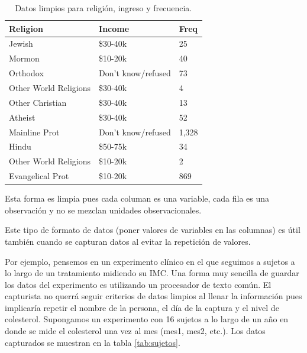 \documentclass[]{article}
\begin{document}
\begin{table}[ht]
\centering
\begin{tabular}{lll}
  \hline
Religion & Income & Freq \\ 
  \hline
Jewish & \$30-40k & 25 \\ 
  Mormon & \$10-20k & 40 \\ 
  Orthodox & Don't know/refused & 73 \\ 
  Other World Religions & \$30-40k & 4 \\ 
  Other Christian & \$30-40k & 13 \\ 
  Atheist & \$30-40k & 52 \\ 
  Mainline Prot & Don't know/refused & 1,328 \\ 
  Hindu & \$50-75k & 34 \\ 
  Other World Religions & \$10-20k & 2 \\ 
  Evangelical Prot & \$10-20k & 869 \\ 
   \hline
\end{tabular}
\caption{Datos limpios para religión, ingreso y frecuencia.} 
\label{tab:ej1limpio}
\end{table}

\begin{nota}[Nota] 
Esta forma es limpia pues cada columan es una variable, cada fila es una observación
y no se mezclan unidades observacionales.
\end{nota}

Este tipo de formato de datos (poner valores de variables en las
columnas) es útil también cuando se capturan datos al evitar la
repetición de valores.

Por ejemplo, pensemos en un experimento clínico en el que seguimos a
sujetos a lo largo de un tratamiento midiendo su IMC. Una forma muy
sencilla de guardar los datos del experimento es utilizando un
procesador de texto común. El capturista no querrá seguir criterios de
datos limpios al llenar la información pues implicaría repetir el nombre
de la persona, el día de la captura y el nivel de colesterol. Supongamos
un experimento con 16 sujetos a lo largo de un año en donde se mide el
colesterol una vez al mes (mes1, mes2, etc.). Los datos capturados se
muestran en la tabla \ref{tab:sujetos}.
\end{document}
